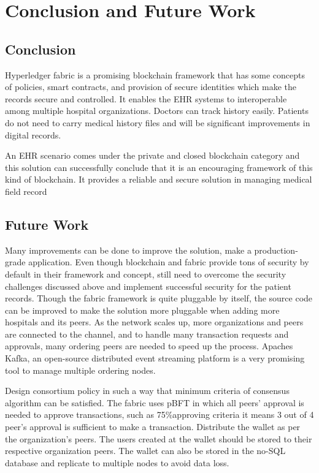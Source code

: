 \chapter{Conclusion and Future Work}
\label{ch:conclusion}

%
%
\section{Conclusion}
\label{sec:conclusion:Conclusion}

Hyperledger fabric is a promising blockchain framework that has some concepts of policies, smart contracts, and provision of secure identities which make the records secure and controlled. It enables the EHR systems to interoperable among multiple hospital organizations. Doctors can track history easily. Patients do not need to carry medical history files and will be significant improvements in digital records. 

An EHR scenario comes under the private and closed blockchain category and this solution can successfully conclude that it is an encouraging framework of this kind of blockchain. It provides a reliable and secure solution in managing medical field record

%
%
\section{Future Work}
\label{sec:conclusion:futurework}

Many improvements can be done to improve the solution, make a production-grade application. Even though blockchain and fabric provide tons of security by default in their framework and concept, still need to overcome the security challenges discussed above and implement successful security for the patient records. Though the fabric framework is quite pluggable by itself, the source code can be improved to make the solution more pluggable when adding more hospitals and its peers. As the network scales up, more organizations and peers are connected to the channel, and to handle many transaction requests and approvals, many ordering peers are needed to speed up the process. Apaches Kafka, an open-source distributed event streaming platform is a very promising tool to manage multiple ordering nodes. 

Design consortium policy in such a way that minimum criteria of consensus algorithm can be satisfied. The fabric uses pBFT in which all peers' approval is needed to approve transactions, such as 75\%approving criteria it means 3 out of 4 peer's approval is sufficient to make a transaction. Distribute the wallet as per the organization's peers. The users created at the wallet should be stored to their respective organization peers. The wallet can also be stored in the no-SQL database and replicate to multiple nodes to avoid data loss. 

